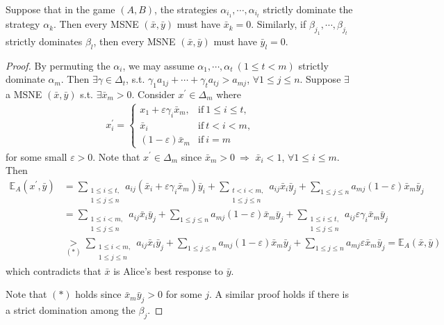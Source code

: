 \setcounter{lemma}{2}
\begin{lemma}
    Suppose that in the game $(A, B)$, the strategies $\alpha_{i_1}, \cdots, \alpha_{i_t}$ strictly dominate the strategy $\alpha_k$. Then every MSNE $(\bar{x}, \bar{y})$ must have $\bar{x}_k =0$. Similarly, if $\beta_{j_1}, \cdots, \beta_{j_t}$ strictly dominates $\beta_l$, then every MSNE $(\bar{x}, \bar{y})$ must have $\bar{y}_l = 0$.
\end{lemma}
\begin{proof}
    By permuting the $\alpha_i$, we may assume $\alpha_1, \cdots, \alpha_t\ (1\leqslant t<m)$ strictly dominate $\alpha_m$. Then $\exists \gamma\in\Delta_t$, s.t. $\gamma_1a_{1j}+\cdots + \gamma_t a_{tj}>a_{mj}$, $\forall 1\leqslant j\leqslant n$. Suppose $\exists$ a MSNE $(\bar{x}, \bar{y})$ s.t. $\exists \bar{x}_m > 0$. Consider $x^{\prime}\in\Delta_m$ where
    \begin{align*}
        x_i^{\prime} = \left\lbrace\begin{array}{ll}
            x_1 + \varepsilon \gamma_i \bar{x}_m,  &\text{if} \ 1\leqslant i\leqslant t, \\
            \bar{x}_i & \text{if} \ t<i<m, \\
            (1-\varepsilon)\bar{x}_m & \text{if} \ i=m
        \end{array} \right.
    \end{align*}
    for some small $\varepsilon > 0$. Note that $x^{\prime}\in\Delta_m$ since $\bar{x}_m>0 \ \Longrightarrow$ $\bar{x}_i < 1$, $\forall 1\leqslant i\leqslant m$. Then
    \begin{align*}
        \mathbb{E}_A(x^{\prime}, \bar{y}) &= \sum\limits_{\substack{1\leqslant i\leqslant t, \\ 1\leqslant j\leqslant n}} a_{ij} (\bar{x}_i + \varepsilon \gamma_i \bar{x}_m) \bar{y}_i + \sum\limits_{\substack{t<i<m, \\ 1\leqslant j\leqslant n}} a_{ij} \bar{x}_i \bar{y}_j + \sum\limits_{1\leqslant j\leqslant n} a_{mj}(1-\varepsilon) \bar{x}_m \bar{y}_j \\
        & = \sum\limits_{\substack{1\leqslant i< m, \\ 1\leqslant j\leqslant n}} a_{ij}\bar{x}_i\bar{y}_j + \sum\limits_{1\leqslant j\leqslant n} a_{mj}(1-\varepsilon) \bar{x}_m\bar{y}_j + \sum\limits_{\substack{1\leqslant i\leqslant t, \\ 1\leqslant j\leqslant n}} a_{ij} \varepsilon \gamma_i \bar{x}_m\bar{y}_j \\
        & \underset{(*)}{>} \sum\limits_{\substack{1\leqslant i<m, \\ 1\leqslant j\leqslant n}}a_{ij}\bar{x}_i\bar{y}_j + \sum\limits_{1\leqslant j\leqslant n}a_{mj}(1-\varepsilon)\bar{x}_m\bar{y}_j  + \sum\limits_{1\leqslant j\leqslant n} a_{mj}\varepsilon \bar{x}_m\bar{y}_j = \mathbb{E}_A(\bar{x}, \bar{y})
    \end{align*}
    which contradicts that $\bar{x}$ is Alice's best response to $\bar{y}$.

   Note that $(*)$ holds since $\bar{x}_m\bar{y}_j > 0$ for some $j$. A similar proof holds if there is a strict domination among the $\beta_j$.
\end{proof}

